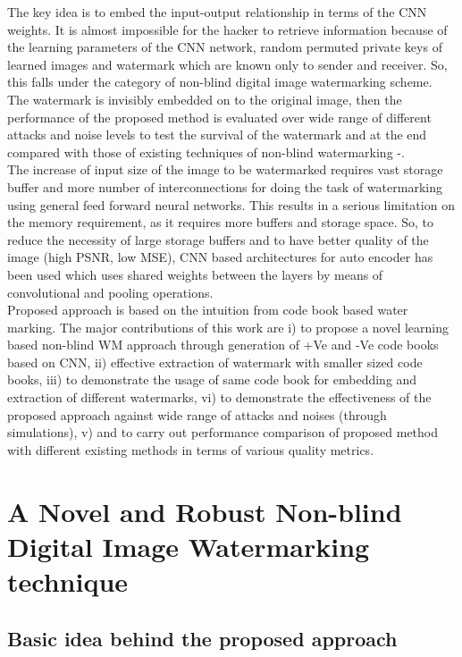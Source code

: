   The key idea is to embed the input-output relationship in terms of the CNN weights. It is almost impossible for the hacker to retrieve information because of the learning parameters of the CNN network, random permuted private keys of learned images and watermark which are known only to sender and receiver. So, this falls under the category of non-blind digital image watermarking scheme. The watermark is invisibly embedded on to the original image, then the performance of the proposed method is evaluated over wide range of different attacks and noise levels to test the survival of the watermark \cite{P16} and at the end compared with those of existing techniques of non-blind watermarking \cite{P4}-\cite{P20}.\\
		
	The increase of input size of the image to be watermarked requires vast storage buffer and more number of interconnections for doing the task of watermarking using general feed forward neural networks. This results in a serious limitation on the memory requirement, as it requires more buffers and storage space. So, to reduce the necessity of large storage buffers \cite{P1}\cite{P3} and to have better quality of the image (high PSNR, low MSE), CNN based architectures for auto encoder has been used which uses shared weights between the layers by means of convolutional and pooling operations.\\

	Proposed approach is based on the  intuition from code book based water marking. The major contributions of this work are i) to propose a novel learning based non-blind WM approach through generation of +Ve and -Ve code books based on CNN, ii) effective extraction of watermark with smaller sized code books, iii) to demonstrate the usage of same code book for embedding and extraction of different watermarks, vi) to demonstrate the effectiveness of the proposed approach against wide range of attacks and noises (through simulations), v) and to carry out performance comparison of proposed method with different existing methods in terms of various quality metrics.\\
	
\section{A Novel and Robust Non-blind Digital Image Watermarking technique}\label{S5}

\subsection{Basic idea behind the proposed approach}

